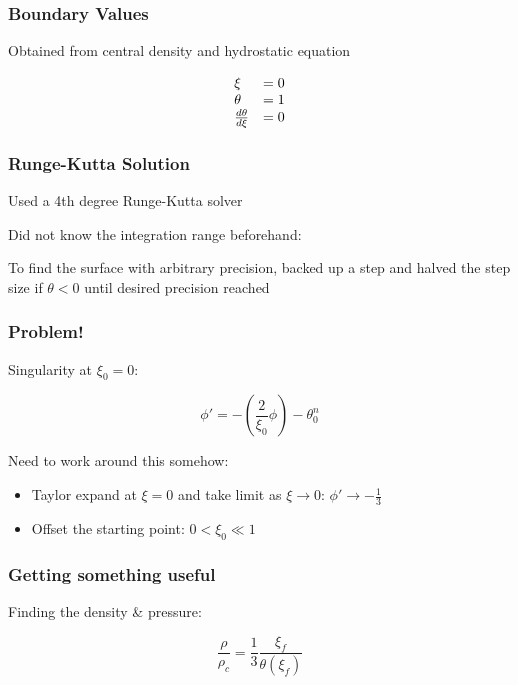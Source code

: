 \documentclass{beamer}
\begin{document}
        \begin{frame}
            \frametitle{Boundary Values}

            Obtained from central density and hydrostatic equation

            \[
                \begin{array}{l l}
                    \xi &= 0 \\
                    \theta &= 1 \\
                    \frac{d\theta}{d\xi} &= 0
                \end{array}
            \]

        \end{frame}

        \begin{frame}
            \frametitle{Runge-Kutta Solution}

            Used a 4th degree Runge-Kutta solver

            Did not know the integration range beforehand:

            To find the surface with arbitrary precision, backed up a step and
            halved the step size if \(\theta<0\) until desired precision reached

        \end{frame}

        \begin{frame}
           \frametitle{Problem!}

            Singularity at \(\xi_0=0\):

            \[ \phi'=-\left(\frac{2}{\xi_0}\phi\right)-\theta_0^n\]

            Need to work around this somehow:
            \pause
            \begin{itemize}
                \item Taylor expand at \(\xi=0\) and take limit as \(\xi\rightarrow 0\): \(\phi'\rightarrow -\frac{1}{3}\)
                \pause
                \item Offset the starting point: \(0< \xi_0 \ll 1\)
            \end{itemize}

        \end{frame}

        \begin{frame}
            \frametitle{Getting something useful}

           Finding the density \& pressure:

           \[\frac{\rho}{\rho_c} = \frac{1}{3}\frac{\xi_f}{\theta(\xi_f)}\]

        \end{frame}
\end{document}
